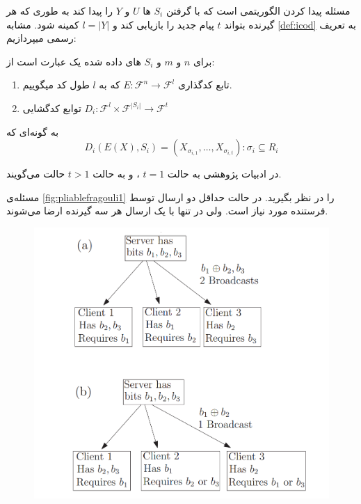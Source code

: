 	 مسئله 
	 \picodt
	 پیدا کردن الگوریتمی است که با گرفتن 
	 $S_i$
	 ها
	 $U$
	 و
	 $Y$
	 را پیدا کند به طوری که هر گیرنده بتواند
	 $t$
	 پیام جدید را بازیابی کند و 
	 $l = |Y|$
	 کمینه شود. مشابه
	 \autoref{def:icod}
	 به تعریف رسمی
	 \picodt
	 میپردازیم:
\begin{definition}[\picodt]
	\label{def:picodt}
	برای
	$n$
	و
	$m$
	و
	$S_i$
	های داده شده یک
	\picodt
	عبارت است از:
	\begin{enumerate}
		\item 
		تابع کدگذاری
		$E: \mathcal{F}^n \rightarrow \mathcal{F}^l$
		که به 
		$l$
		طول کد میگوییم.
		\item 
		توابع کدگشایی 
		$D_i: \mathcal{F}^l \times \mathcal{F}^{|S_i|} \rightarrow \mathcal{F}^t$
	\end{enumerate}
	به گونه‌ای که
	$$D_i(E(X), S_i) = (X_{\sigma_{i,1}}, \ldots, X_{\sigma_{i,t}}): \sigma_i \subseteq R_i$$
\end{definition}

در ادبیات پژوهشی به حالت
$t = 1$
،
\picod
 و به حالت
$t > 1$
حالت
می‌گویند.

\begin{remark}
مسئله‌ی 
\autoref{fig:pliablefragouli1}
را در نظر بگیرید. در حالت 
\icod
 حداقل دو ارسال توسط فرستنده مورد نیاز است. ولی در
 \picod
 تنها با یک ارسال هر سه گیرنده ارضا می‌شوند.
 \begin{figure}[H]
 	\centering
 	\includegraphics[width=0.6\linewidth]{figs/ch3/pliable_fragouli1}
 	\caption[
 	تفاوت
 	\icod
 	و
 	\picod
 	]{\cite{pliablefirstpaper}}
 	\label{fig:pliablefragouli1}
 \end{figure}
\end{remark}

